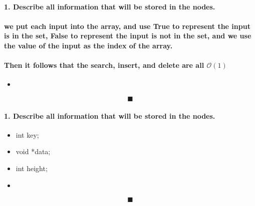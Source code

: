 \documentclass{article}
\begin{document}
\paragraph*{1. Describe all information that will be stored in the nodes. \\}
\newline
{}
\newline
{}
\newline
{}
\newline
{}
\paragraph{we put each input into the array, and use True to represent the input is in the set, False to represent the input is not in the set, and we use the value of the input as the index of the array.}
\paragraph{Then it follows that the search, insert, and delete are all $\mathcal{O}(1)$}



\begin{itemize}
    \item 
\end{itemize}

$$ \blacksquare $$
\newpage

\paragraph*{1. Describe all information that will be stored in the nodes.}
\begin{itemize}
    \item int key;
    \item void *data;
    \item int height;
    \item 
\end{itemize}

\newpage

\mbox{}
\vfill{$$\blacksquare$$}
\end{document}
